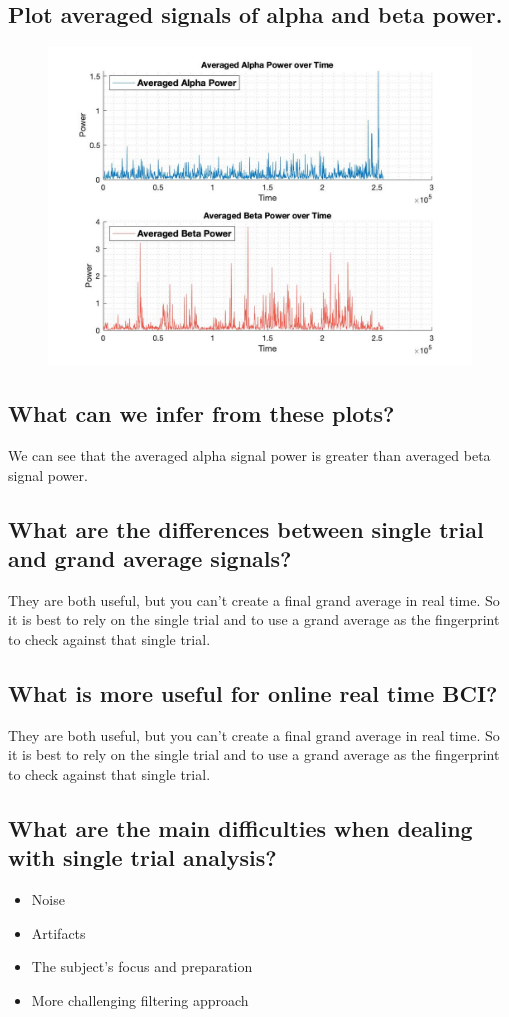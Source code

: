 \documentclass[12pt]{article}
\begin{document}
\subsection{Plot averaged signals of alpha and beta power.}
\begin{figure}[!htb]
    \includegraphics[scale=0.4, center]{alpha_beta_power}
\end{figure}

\subsection{What can we infer from these plots?}
We can see that the averaged alpha signal power is greater than averaged beta signal power.\clearpage

\subsection{What are the differences between single trial and grand average signals?}
They are both useful, but you can’t create a final grand average in real time. So it is best to rely on the single trial and to use a grand average as the fingerprint to check against that single trial.

\subsection{What is more useful for online real time BCI?}
They are both useful, but you can’t create a final grand average in real time. So it is best to rely on the single trial and to use a grand average as the fingerprint to check against that single trial.

\subsection{What are the main difficulties when dealing with single trial analysis?}
\begin{itemize}
  \item Noise
  \item Artifacts
  \item The subject's focus and preparation
  \item More challenging filtering approach
\end{itemize}
\end{document}
